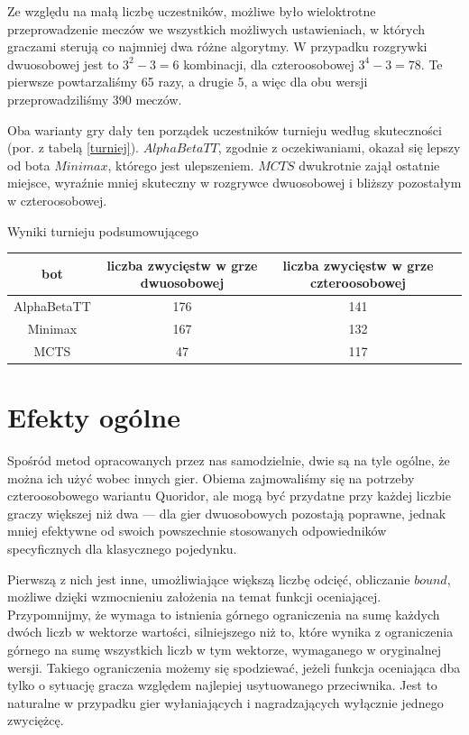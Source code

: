 \documentclass{pracamgr}
\begin{document}
Ze względu na małą liczbę uczestników, możliwe było wieloktrotne przeprowadzenie meczów we wszystkich możliwych ustawieniach, w których graczami sterują co najmniej dwa różne algorytmy.
W przypadku rozgrywki dwuosobowej jest to \(3^2 - 3 = 6\) kombinacji, dla czteroosobowej \(3^4 - 3 = 78\).
Te pierwsze powtarzaliśmy 65 razy, a drugie 5, a więc dla obu wersji przeprowadziliśmy 390 meczów.

Oba warianty gry dały ten porządek uczestników turnieju według skuteczności (por. z tabelą \ref{turniej}).
\(AlphaBetaTT\), zgodnie z oczekiwaniami, okazał się lepszy od bota \(Minimax\), którego jest ulepszeniem.
\(MCTS\) dwukrotnie zajął ostatnie miejsce, wyraźnie mniej skuteczny w rozgrywce dwuosobowej i bliższy pozostałym w czteroosobowej.

\begin{tabela}
    \caption{Wyniki turnieju podsumowującego \label{turniej}}
    \begin{tabular}{| c | c | c | c |}
	\hline
        bot & liczba zwycięstw w grze dwuosobowej & liczba zwycięstw w grze czteroosobowej \\ \hline
	\hline
        AlphaBetaTT & 176 & 141 \\ \hline
        Minimax & 167 & 132 \\ \hline
        MCTS & 47 & 117 \\ \hline
    \end{tabular}
\end{tabela}

\section{Efekty ogólne}

Spośród metod opracowanych przez nas samodzielnie, dwie są na tyle ogólne, że można ich użyć wobec innych gier.
Obiema zajmowaliśmy się na potrzeby czteroosobowego wariantu Quoridor, ale mogą być przydatne przy każdej liczbie graczy większej niż dwa --- dla gier dwuosobowych pozostają poprawne, jednak mniej efektywne od swoich powszechnie stosowanych odpowiedników specyficznych dla klasycznego pojedynku.

Pierwszą z nich jest inne, umożliwiające większą liczbę odcięć, obliczanie \(bound\), możliwe dzięki wzmocnieniu założenia na temat funkcji oceniającej.
Przypomnijmy, że wymaga to istnienia górnego ograniczenia na sumę każdych dwóch liczb w wektorze wartości, silniejszego niż to, które wynika z ograniczenia górnego na sumę wszystkich liczb w tym wektorze, wymaganego w oryginalnej wersji.
Takiego ograniczenia możemy się spodziewać, jeżeli funkcja oceniająca dba tylko o sytuację gracza względem najlepiej usytuowanego przeciwnika.
Jest to naturalne w przypadku gier wyłaniających i nagradzających wyłącznie jednego zwyciężcę.
\end{document}
